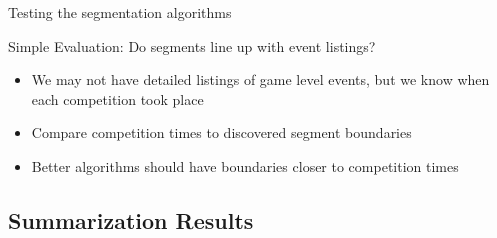 \documentclass[compress]{beamer}
\begin{document}
\begin{frame}{Testing the segmentation algorithms}
\begin{block}{Simple Evaluation: Do segments line up with event listings?}
\begin{itemize}
\item We may not have detailed listings of game level events, but we know when
each competition took place
\item Compare competition times to discovered segment boundaries
\item Better algorithms should have boundaries closer to competition times
\end{itemize}
\end{block}


\end{frame}

\subsection{Summarization Results}
\end{document}

